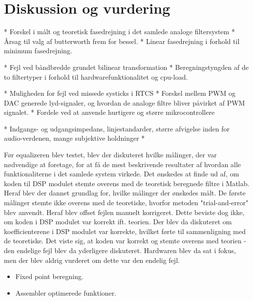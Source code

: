 \chapter{Diskussion og vurdering}\label{kap:diskussion}


* Forskel i målt og teoretisk fasedrejning i det samlede analoge filtersystem
* Årsag til valg af butterworth frem for bessel. 
* Linear fasedrejning i forhold til minimum fasedrejning.

* Fejl ved båndbredde grundet bilinear transformation 
* Beregningstyngden af de to filtertyper i forhold til hardwarefunktionalitet og cpu-load. 

* Muligheden for fejl ved missede systicks i RTCS
* Forskel mellem PWM og DAC generede lyd-signaler, og hvordan de analoge filtre bliver påvirket af PWM signalet.
* Fordele ved at anvende hurtigere og større mikrocontrollere

* Indgangs- og udgangsimpedans, linjestandarder, større afvigelse inden for audio-verdenen, mange subjektive holdninger
* 







Før equalizeren blev testet, blev der diskuteret hvilke målinger, der var nødvendige at foretage, for at få de mest beskrivende resultater af hvordan alle funktionaliterne i det samlede system virkede.
Det ønskedes at finde ud af, om koden til DSP modulet stemte overens med de teoretisk beregnede filtre i Matlab. 
Heraf blev der dannet grundlag for, hvilke målinger der ønskedes målt.
De første målinger stemte ikke overens med de teoretiske, hvorfor metoden "trial-and-error" blev anvendt. 
Heraf blev offset fejlen manuelt korrigeret.
Dette beviste dog ikke, om koden i DSP modulet var korrekt ift. teorien.
Der blev da diskuteret om koefficienterene i DSP modulet var korrekte, hvilket førte til sammenligning med de teoretiske.
Det viste sig, at koden var korrekt og stemte overens med teorien - den endelige fejl blev da yderligere diskuteret.
Hardwaren blev da sat i fokus, men der blev aldrig vurderet om dette var den endelig fejl.





 


\begin{itemize}
\item Fixed point beregning.
\item Assembler optimerede funktioner.
\end{itemize}